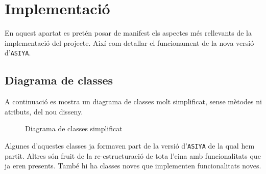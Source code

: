 \documentclass[11pt,a4paper]{article}
\begin{document}
\newpage
\section{Implementació}
En aquest apartat es pretén posar de manifest els aspectes més rellevants de la implementació del projecte. Així com detallar el funcionament de la nova versió d'\texttt{ASIYA}.


\subsection{Diagrama de classes}
A continuació es mostra un diagrama de classes molt simplificat, sense mètodes ni atributs, del nou disseny.
\\

\begin{figure} [!h]
\caption{Diagrama de classes simplificat}
\end{figure}

Algunes d'aquestes classes ja formaven part de la versió d'\texttt{ASIYA} de la qual hem partit. Altres són fruit de la re-estructuració de tota l'eina amb funcionalitats que ja eren presents. També hi ha classes noves que implementen funcionalitats noves.
\\
\end{document}
